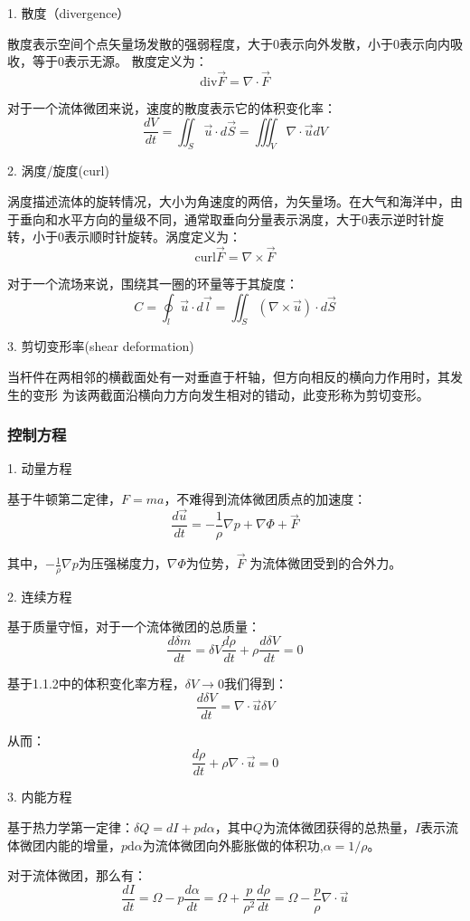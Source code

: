 \documentclass{article}
\begin{document}
1. 散度（divergence）

散度表示空间个点矢量场发散的强弱程度，大于$0$表示向外发散，小于$0$表示向内吸收，等于$0$表示无源。
散度定义为：$$\text{div} \vec{F} = \nabla\cdot\vec{F}$$

对于一个流体微团来说，速度的散度表示它的体积变化率：
$$\frac{dV}{dt} = \iint_S \vec{u}\cdot d\vec{S} = \iiint_V \nabla\cdot\vec{u} dV$$

2. 涡度/旋度(curl)

涡度描述流体的旋转情况，大小为角速度的两倍，为矢量场。在大气和海洋中，由于垂向和水平方向的量级不同，通常取垂向分量表示涡度，大于$0$表示逆时针旋转，小于$0$表示顺时针旋转。涡度定义为：
$$\text{curl} \vec{F} = \nabla \times \vec{F}$$

对于一个流场来说，围绕其一圈的环量等于其旋度：
$$C = \oint_l \vec{u}\cdot d\vec{l} = \iint_S (\nabla\times\vec{u})\cdot d\vec{S}$$

3. 剪切变形率(shear deformation)

当杆件在两相邻的横截面处有一对垂直于杆轴，但方向相反的横向力作用时，其发生的变形
为该两截面沿横向力方向发生相对的错动，此变形称为剪切变形。

\subsubsection{控制方程}

1. 动量方程

基于牛顿第二定律，$F=ma$，不难得到流体微团质点的加速度：
$$\frac{d\vec{u}}{dt} = -\frac{1}{\rho}\nabla p + \nabla\Phi+\vec{F}$$

其中，$-\frac{1}{\rho}\nabla p$为压强梯度力，$\nabla\Phi$为位势，$\vec{F}$ 为流体微团受到的合外力。

2. 连续方程

基于质量守恒，对于一个流体微团的总质量：
$$\frac{d\delta m}{dt} = \delta V\frac{d\rho}{dt} +\rho\frac{d\delta V}{dt}=0$$

基于1.1.2中的体积变化率方程，$\delta V \rightarrow 0$我们得到：
$$\frac{d\delta V}{dt} = \nabla\cdot\vec{u} \delta V$$

从而：
$$\frac{d\rho}{dt} +\rho\nabla\cdot\vec{u}=0$$

3. 内能方程

基于热力学第一定律：$\delta Q = dI + pd\alpha$，其中$Q$为流体微团获得的总热量，$I$表示流体微团内能的增量，$p\text{d}\alpha$为流体微团向外膨胀做的体积功,$\alpha = 1/\rho$。

对于流体微团，那么有：$$\frac{dI}{dt} = \Omega - p\frac{d\alpha}{dt} 
= \Omega + \frac{p}{\rho^2}\frac{d\rho}{dt}
=\Omega - \frac{p}{\rho}\nabla\cdot\vec{u}$$
\end{document}

